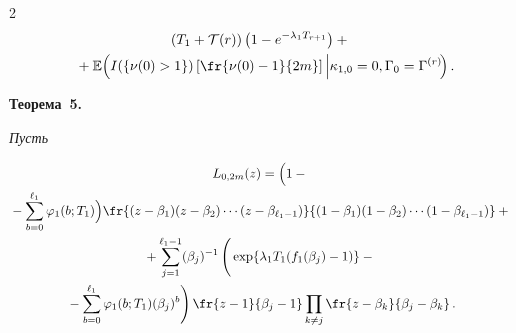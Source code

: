 \begin{multicols}{2}
\begin{multline*}
    \left(T_1+\mathcal T(r)\right)\left(1-e^{-\lambda_1 T_{r+1}}\right) + {}\\

    {}+\mathbb{E}\! \left(

    I(\{\nu(0)>1\}) \left[ \fr{\nu(0)-1}{2m} \right] \Big| \kappa_{1,0}=0,

    \Gamma_0=\Gamma^{(r)} \!\right).\hspace*{-6pt}


\end{multline*}





\noindent

\textbf{Теорема~5.}\

\textit{Пусть}



\vspace*{-6pt}



\noindent

  \begin{multline*}

    L_{0,2m}(z)=

    \Bigl(1-{}\\

    {}-\sum\limits_{b=0}^{\ell_1} \varphi_1(b; T_1)\Bigr)

      \fr{(z-\beta_{1})(z-\beta_2)\cdots(z-\beta_{\ell_1-1})}%

    {(1-\beta_{1})(1-\beta_2)\cdots (1-\beta_{\ell_1-1})}+{}\\

{} +\sum\limits_{j=1}^{\ell_1-1}(\beta_{j})^{-1}

    \left(

    \vphantom{\sum\limits_{b=0}^{\ell_1}} 

    \exp\{\lambda_{1} T_1(f_{1}(\beta_{j})-1)\}-{}\right.\\

\left.    {}-\sum\limits_{b=0}^{\ell_1} 

\varphi_1(b; T_1) (\beta_j)^b

    \right)

    \fr{z-1}{\beta_{j}-1}\prod\limits_{k\neq j}\fr{z-\beta_{k}}{\beta_{j}-

\beta_{k}}\,.

  \end{multline*}

  


\end{multicols}
